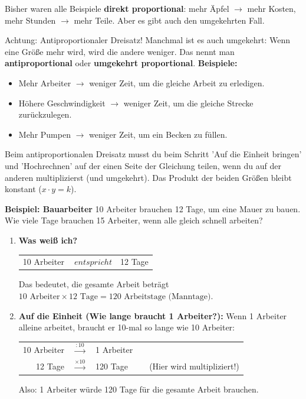 Bisher waren alle Beispiele \textbf{direkt proportional}: mehr Äpfel $\rightarrow$ mehr Kosten, mehr Stunden $\rightarrow$ mehr Teile. Aber es gibt auch den umgekehrten Fall.

\begin{infoboxumgebung}{Achtung: Antiproportionaler Dreisatz!}
Manchmal ist es auch umgekehrt: Wenn eine Größe mehr wird, wird die andere weniger. Das nennt man \textbf{antiproportional} oder \textbf{umgekehrt proportional}.
\textbf{Beispiele:}
\begin{itemize}
    \item Mehr Arbeiter $\rightarrow$ weniger Zeit, um die gleiche Arbeit zu erledigen.
    \item Höhere Geschwindigkeit $\rightarrow$ weniger Zeit, um die gleiche Strecke zurückzulegen.
    \item Mehr Pumpen $\rightarrow$ weniger Zeit, um ein Becken zu füllen.
\end{itemize}

Beim antiproportionalen Dreisatz musst du beim Schritt 'Auf die Einheit bringen' und 'Hochrechnen' auf der einen Seite der Gleichung teilen, wenn du auf der anderen multiplizierst (und umgekehrt). Das Produkt der beiden Größen bleibt konstant ($x \cdot y = k$).

\textbf{Beispiel: Bauarbeiter}
10 Arbeiter brauchen 12 Tage, um eine Mauer zu bauen. Wie viele Tage brauchen 15 Arbeiter, wenn alle gleich schnell arbeiten?

\begin{enumerate}
    \item \textbf{Was weiß ich?}
    \begin{tabular}{rcl}
        10 Arbeiter & $\ entspricht $ & 12 Tage \\
    \end{tabular}
    Das bedeutet, die gesamte Arbeit beträgt $10 \text{ Arbeiter} \times 12 \text{ Tage} = 120 \text{ Arbeitstage (Manntage)}$.

    \item \textbf{Auf die Einheit (Wie lange braucht 1 Arbeiter?):}
    Wenn 1 Arbeiter alleine arbeitet, braucht er 10-mal so lange wie 10 Arbeiter:
    \begin{tabular}{rclcl}
        10 Arbeiter & $\xrightarrow{:10}$ & 1 Arbeiter & & \\
        12 Tage & $\xrightarrow{\times 10}$ & 120 Tage & & \small{(Hier wird multipliziert!)} \\
    \end{tabular}
    Also: 1 Arbeiter würde 120 Tage für die gesamte Arbeit brauchen.


\end{enumerate}
\end{infoboxumgebung}
